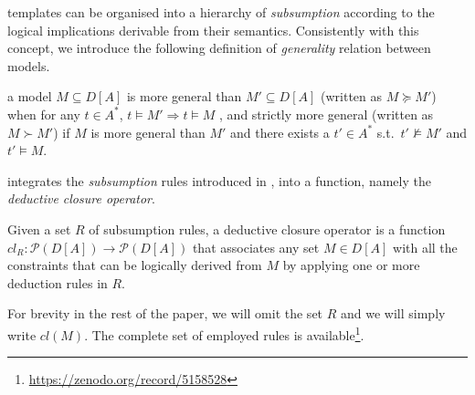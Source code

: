 \declare templates can be organised into a hierarchy of \emph{subsumption} \cite{2017-DiCiccio} according to the logical implications derivable from their semantics. Consistently with this concept, we introduce the following definition of \emph{generality} relation between models.
\begin{definition}{}
a model $M\subseteq D[A]$ is more general than $M'\subseteq D[A]$ (written as $M \succeq M'$) when for any $t\in A^*$, $t\models M' \Rightarrow t\models M$ , and strictly more general (written as $M \succ M'$) if $M$ is more general than $M'$ and there exists a $t'\in A^*$ s.t.\ $t'\not\models M'$ and $t'\models M$.
\end{definition}

\nd integrates the \emph{subsumption} rules introduced in \cite{2017-DiCiccio}, into a function, namely the \emph{deductive closure operator}.

\begin{definition}{}
Given a set $R$ of subsumption rules, a deductive closure operator is a function $cl_R: \mathcal{P}(D[A])\rightarrow\mathcal{P}(D[A])$ that associates any set $M \in D[A]$ with all the constraints that can be logically derived from $M$ by applying one or more deduction rules in $R$.
\end{definition}
For brevity in the rest of the paper, we will omit the set $R$ and we will simply write $cl(M)$. The complete set of employed rules is available\footnote{\url{https://zenodo.org/record/5158528}}.




